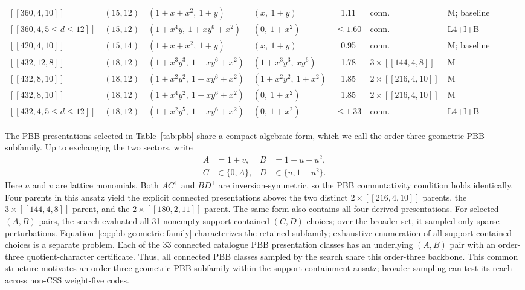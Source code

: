 \documentclass[aps,prx,twocolumn,superscriptaddress,nofootinbib,floatfix]{revtex4-2}
\newcommand{\code}[1]{\ensuremath{\left[\!\left[#1\right]\!\right]}}
\begin{document}
\begin{table}[t]
\begin{tabular}{lcllcll}
$\code{360,4,10}$ & $(15,12)$ & $(1+x+x^2,\ 1+y)$ & $(x,\ 1+y)$ & 1.11 & conn. & M; baseline\\
$\code{360,4,5{\leq}d{\leq}12}$ & $(15,12)$ & $(1+x^4y,\ 1+xy^6+x^2)$ & $(0,\ 1+x^2)$ & $\leq1.60$ & conn. & L4+I+B\\
$\code{420,4,10}$ & $(15,14)$ & $(1+x+x^2,\ 1+y)$ & $(x,\ 1+y)$ & 0.95 & conn. & M; baseline\\
$\code{432,12,8}$ & $(18,12)$ & $(1+x^3y^3,\ 1+xy^6+x^2)$ & $(1+x^3y^3,\ xy^6)$ & 1.78 & $3\times\code{144,4,8}$ & M\\
$\code{432,8,10}$ & $(18,12)$ & $(1+x^2y^2,\ 1+xy^6+x^2)$ & $(1+x^2y^2,\ 1+x^2)$ & 1.85 & $2\times\code{216,4,10}$ & M\\
$\code{432,8,10}$ & $(18,12)$ & $(1+x^4y^2,\ 1+xy^6+x^2)$ & $(0,\ 1+x^2)$ & 1.85 & $2\times\code{216,4,10}$ & M\\
$\code{432,4,5{\leq}d{\leq}12}$ & $(18,12)$ & $(1+x^2y^5,\ 1+xy^6+x^2)$ & $(0,\ 1+x^2)$ & $\leq1.33$ & conn. & L4+I+B\\
\bottomrule
\end{tabular}
\end{table}

The PBB presentations selected in Table~\ref{tab:pbb} share a compact algebraic
form, which we call the
order-three geometric PBB subfamily.  Up to exchanging the two sectors, write
\begin{equation}
 \begin{aligned}
 A&=1+v, & B&=1+u+u^2,\\
 C&\in\{0,A\}, & D&\in\{u,1+u^2\}.
 \end{aligned}
\label{eq:pbb-geometric-family}
\end{equation}
Here $u$ and $v$ are lattice monomials.  Both
$AC^\mathsf{T}$ and $BD^\mathsf{T}$ are inversion-symmetric, so the PBB
commutativity condition holds identically.  Four parents in this ansatz yield
the explicit connected presentations above: the two distinct
$2\times\code{216,4,10}$ parents, the $3\times\code{144,4,8}$ parent, and the
$2\times\code{180,2,11}$ parent.  The same form also contains all four derived
presentations.  For selected $(A,B)$ pairs, the search evaluated all 31
nonempty support-contained $(C,D)$ choices; over the broader set, it sampled
only sparse perturbations.  Equation~\eqref{eq:pbb-geometric-family}
characterizes the retained subfamily; exhaustive enumeration of all
support-contained choices is a separate problem.  Each of the 33 connected
catalogue PBB presentation classes has an
underlying $(A,B)$ pair with an order-three quotient-character certificate.
Thus, all connected PBB classes sampled by the search share this order-three
backbone.  This common structure motivates an order-three geometric PBB
subfamily within the support-containment ansatz; broader sampling can test its
reach across non-CSS weight-five codes.
\end{document}
